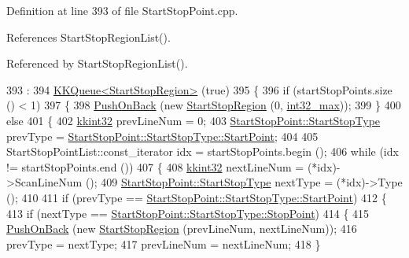Definition at line 393 of file Start\+Stop\+Point.\+cpp.



References Start\+Stop\+Region\+List().



Referenced by Start\+Stop\+Region\+List().


\begin{DoxyCode}
393                                                                                    :
394     \hyperlink{class_k_k_b_1_1_k_k_queue}{KKQueue<StartStopRegion>} (\textcolor{keyword}{true})
395 \{
396   \textcolor{keywordflow}{if}  (startStopPoints.size () < 1)
397   \{
398     \hyperlink{class_k_k_b_1_1_k_k_queue_aa9fba4632b54268bf71ecb42dee0b575}{PushOnBack} (\textcolor{keyword}{new} \hyperlink{class_k_k_l_s_c_1_1_start_stop_region}{StartStopRegion} (0, \hyperlink{_k_k_base_types_8h_ab1240c5d3fea865121ed4684f8e968f6}{int32\_max}));
399   \}
400   \textcolor{keywordflow}{else}
401   \{
402     \hyperlink{namespace_k_k_b_a8fa4952cc84fda1de4bec1fbdd8d5b1b}{kkint32}  prevLineNum = 0;
403     \hyperlink{class_k_k_l_s_c_1_1_start_stop_point_aca5818602fc58bfe4c9794b311288680}{StartStopPoint::StartStopType}  prevType = 
      \hyperlink{class_k_k_l_s_c_1_1_start_stop_point_aca5818602fc58bfe4c9794b311288680a66ebb760a5bef13b69ceac0feb004d2a}{StartStopPoint::StartStopType::StartPoint};
404 
405     StartStopPointList::const\_iterator  idx = startStopPoints.begin ();
406     \textcolor{keywordflow}{while}  (idx != startStopPoints.end ())
407     \{
408       \hyperlink{namespace_k_k_b_a8fa4952cc84fda1de4bec1fbdd8d5b1b}{kkint32}  nextLineNum = (*idx)->ScanLineNum ();
409       \hyperlink{class_k_k_l_s_c_1_1_start_stop_point_aca5818602fc58bfe4c9794b311288680}{StartStopPoint::StartStopType}  nextType = (*idx)->Type ();
410 
411       \textcolor{keywordflow}{if}  (prevType == \hyperlink{class_k_k_l_s_c_1_1_start_stop_point_aca5818602fc58bfe4c9794b311288680a66ebb760a5bef13b69ceac0feb004d2a}{StartStopPoint::StartStopType::StartPoint})
412       \{
413         \textcolor{keywordflow}{if}  (nextType == \hyperlink{class_k_k_l_s_c_1_1_start_stop_point_aca5818602fc58bfe4c9794b311288680a4fa60ea4d5684f76f0f766d39f06de4f}{StartStopPoint::StartStopType::StopPoint})
414         \{
415           \hyperlink{class_k_k_b_1_1_k_k_queue_aa9fba4632b54268bf71ecb42dee0b575}{PushOnBack} (\textcolor{keyword}{new} \hyperlink{class_k_k_l_s_c_1_1_start_stop_region}{StartStopRegion} (prevLineNum, nextLineNum));
416           prevType = nextType;
417           prevLineNum = nextLineNum;
418         \}

\end{DoxyCode}
